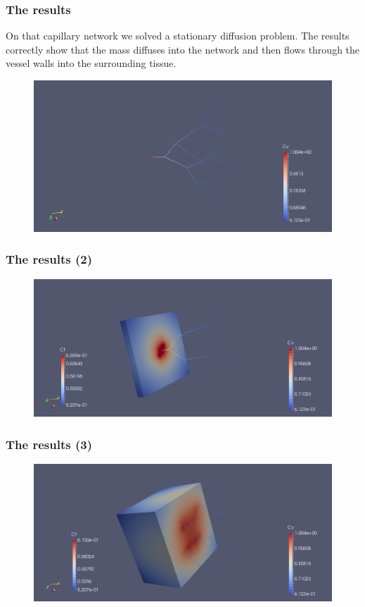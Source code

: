 \documentclass[11pt]{beamer}
\begin{document}
	\begin{frame}
		\frametitle{The results}
		On that capillary network we solved a stationary diffusion problem. The results correctly show that the mass diffuses into the network and then flows through the vessel walls into the surrounding tissue.
		\begin{figure}[h]
			\centering
			\includegraphics[width=0.8\linewidth]{cv}
			\label{fig:cv}
		\end{figure}
	\end{frame}
	
	\begin{frame}
		\frametitle{The results (2)}
		\begin{figure}[!h]
			\centering
			\includegraphics[width=0.9\linewidth]{ct1}
			\label{fig:ct1}
		\end{figure}
	\end{frame}
	
	\begin{frame}
		\frametitle{The results (3)}
		\begin{figure}[!h]
			\centering
			\includegraphics[width=0.9\linewidth]{ct2}
			\label{fig:ct2}
		\end{figure}
	\end{frame}
	
\end{document}
